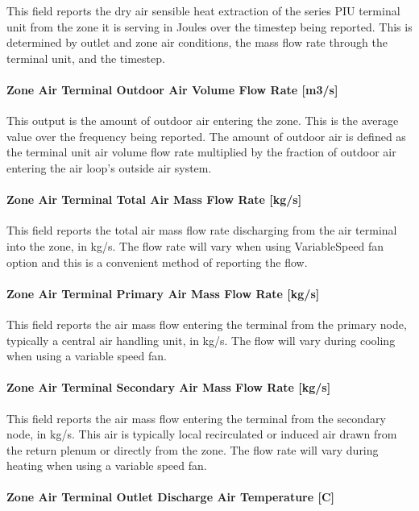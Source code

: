 This field reports the dry air sensible heat extraction of the series PIU terminal unit from the zone it is serving in Joules over the timestep being reported. This is determined by outlet and zone air conditions, the mass flow rate through the terminal unit, and the timestep.

\paragraph{Zone Air Terminal Outdoor Air Volume Flow Rate {[}m3/s{]}}

This output is the amount of outdoor air entering the zone. This is the average value over the frequency being reported. The amount of outdoor air is defined as the terminal unit air volume flow rate multiplied by the fraction of outdoor air entering the air loop's outside air system.

\paragraph{Zone Air Terminal Total Air Mass Flow Rate {[}kg/s{]}}

This field reports the total air mass flow rate discharging from the air terminal into the zone, in kg/s.  The flow rate will vary when using VariableSpeed fan option and this is a convenient method of reporting the flow.

\paragraph{Zone Air Terminal Primary Air Mass Flow Rate {[}kg/s{]}}

This field reports the air mass flow entering the terminal from the primary node, typically a central air handling unit, in kg/s.  The flow will vary during cooling when using a variable speed fan. 

\paragraph{Zone Air Terminal Secondary Air Mass Flow Rate {[}kg/s{]}}

This field reports the air mass flow entering the terminal from the secondary node, in kg/s. This air is typically local recirculated or induced air drawn from the return plenum or directly from the zone.  The flow rate will vary during heating when using a variable speed fan.

\paragraph{Zone Air Terminal Outlet Discharge Air Temperature {[}C{]}}

